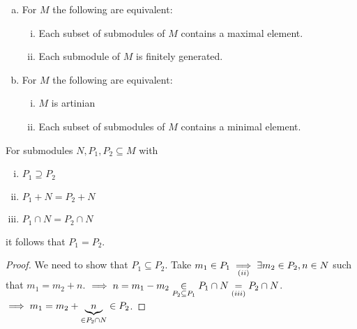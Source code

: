 \documentclass[a4paper]{report}
\begin{document}
\begin{facts}\item

  \begin{enumerate}[(a)]
    \item For $M$ the following are equivalent:
          \begin{enumerate}[(i)]
            \item Each subset of submodules of $M$ contains a maximal element.
                  \item Each submodule of $M$ is finitely generated.
          \end{enumerate}
    \item For $M$ the following are equivalent:
          \begin{enumerate}[(i)]
            \item $M$ is artinian
            \item Each subset of submodules of $M$ contains a minimal element.
          \end{enumerate}
  \end{enumerate}
\end{facts}
\begin{lemm}
  For submodules $N, P_{1}, P_{2} \subseteq M$ with
  \begin{enumerate}[(i)]
    \item $P_{1} \supseteq P_{2}$
    \item $P_{1} + N = P_{2} + N$
    \item $P_{1} \cap N = P_{2} \cap N$
  \end{enumerate}
  it follows that $P_{1} = P_{2}$.
\end{lemm}
\begin{proof}
  We need to show that $P_{1} \subseteq P_{2}$. Take $m_{1} \in P_{1} \underset{(ii)} {\implies} \exists m_{2} \in P_{2}, n \in N$ such that $m_{1} = m_{2} + n$. $\implies n = m_{1} - m_{2} \underset{P_{2} \subseteq P_{1}}\in P_{1} \cap N \underset{(iii)}= P_{2} \cap N$. $\implies m_{1} = m_{2} + \underbrace{n}_{\in P_{2} \cap N} \in  P_{2}$. \qedhere
\end{proof}
\end{document}

